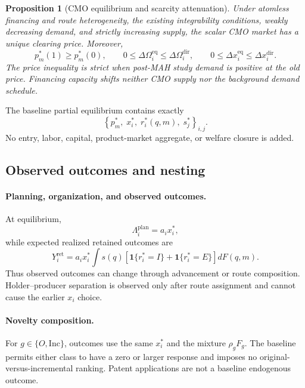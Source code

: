 \documentclass[12pt]{article}
\newtheorem{proposition}{Proposition}
\newcommand{\1}{\mathbf{1}}
\begin{document}
\begin{proposition}[CMO equilibrium and scarcity attenuation]
\label{prop:main-finance-cmo}
Under atomless financing and route heterogeneity, the existing integrability
conditions, weakly decreasing demand, and strictly increasing supply, the
scalar CMO market has a unique clearing price. Moreover,
\begin{equation}
  p_m^*(1)\geq p_m^*(0),
  \qquad
  0\leq\Delta\Omega_i^{\mathrm{eq}}
  \leq\Delta\Omega_i^{\mathrm{dir}},
  \qquad
  0\leq\Delta x_i^{\mathrm{eq}}
  \leq\Delta x_i^{\mathrm{dir}}.
  \label{eq:p16m-scarcity-attenuation}
\end{equation}
The price inequality is strict when post-MAH study demand is positive at the
old price. Financing capacity shifts neither CMO supply nor the background
demand schedule.
\end{proposition}

The baseline partial equilibrium contains exactly
\begin{equation}
  \left\{
  p_m^*,\;
  x_i^*,\;
  r_i^*(q,m),\;
  s_j^*
  \right\}_{i,j}.
  \label{eq:p16m-equilibrium}
\end{equation}
No entry, labor, capital, product-market aggregate, or welfare closure is
added.

\subsection{Observed outcomes and nesting}
\label{subsec:p16m-predictions}

\paragraph{Planning, organization, and observed outcomes.}
At equilibrium,
\[
  \Lambda_i^{\mathrm{plan}}=a_ix_i^*,
\]
while expected realized retained outcomes are
\begin{equation}
  Y_i^{\mathrm{ret}}
  =
  a_ix_i^*
  \int s(q)
  \left[
  \mathbf 1\{r_i^*=I\}
  +
  \mathbf 1\{r_i^*=E\}
  \right]dF(q,m).
  \label{eq:p16m-retained-outcome}
\end{equation}
Thus observed outcomes can change through advancement or route composition.
Holder--producer separation is observed only after route assignment and
cannot cause the earlier \(x_i\) choice.

\paragraph{Novelty composition.}
For \(g\in\{O,\mathrm{Inc}\}\), outcomes use the same \(x_i^*\) and the
mixture \(\rho_gF_g\). The baseline permits either class to have a zero or
larger response and imposes no original-versus-incremental ranking. Patent
applications are not a baseline endogenous outcome.
\end{document}
